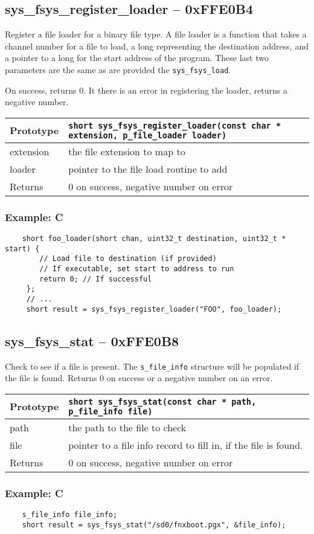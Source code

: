 \subsection*{sys\_fsys\_register\_loader -- 0xFFE0B4}
Register a file loader for a binary file type.
A file loader is a function that takes a channel number for a file to load, a long representing the destination address, and a pointer to a long for the start address of the program. These last two parameters are the same as are provided the \verb+sys_fsys_load+.

On success, returns 0. It there is an error in registering the loader, returns a negative number.

\bigskip

\begin{tabular}{|l||l|} \hline
Prototype & \lstinline!short sys_fsys_register_loader(const char * extension, p_file_loader loader)! \\ \hline
extension & the file extension to map to \\ \hline
loader & pointer to the file load routine to add \\ \hline
Returns & 0 on success, negative number on error \\ \hline
\end{tabular}

\subsubsection*{Example: C}
\begin{lstlisting}
    short foo_loader(short chan, uint32_t destination, uint32_t * start) {
        // Load file to destination (if provided)
        // If executable, set start to address to run
        return 0; // If successful
     };
     // ...
     short result = sys_fsys_register_loader("FOO", foo_loader);
\end{lstlisting}

\subsection*{sys\_fsys\_stat -- 0xFFE0B8}
Check to see if a file is present. The \verb+s_file_info+ structure will be populated if the file is found.
Returns 0 on success or a negative number on an error.

\bigskip

\begin{tabular}{|l||l|} \hline
Prototype & \lstinline!short sys_fsys_stat(const char * path, p_file_info file)! \\ \hline
path & the path to the file to check \\ \hline
file & pointer to a file info record to fill in, if the file is found. \\ \hline
Returns & 0 on success, negative number on error \\ \hline
\end{tabular}

\subsubsection*{Example: C}
\begin{lstlisting}
    s_file_info file_info;
    short result = sys_fsys_stat("/sd0/fnxboot.pgx", &file_info);
\end{lstlisting}